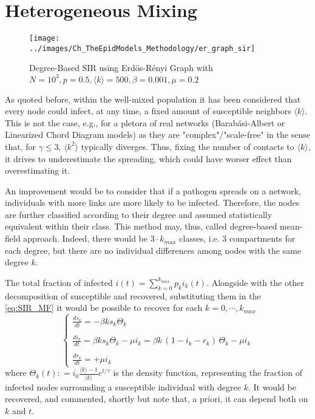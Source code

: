 \documentclass[a4paper,12pt,twoside]{book} %
\theoremstyle{definition}
\begin{document}
\newpage
\section{Heterogeneous Mixing}
\begin{figure}[ht]
	\texttt{[image: ../images/Ch\_TheEpidModels\_Methodology/er\_graph\_sir]}
	\caption{Degree-Based SIR using Erdös-Rényi Graph with $N = 10^{3}, p = 0.5, \langle k \rangle = 500, \beta = 0.001,  \mu = 0.2$}
	\label{fig:DB_SIR}
\end{figure}
As quoted before, within the well-mixed population it has been considered that every node could infect, at any time, a fixed amount of susceptible neighbors $\langle k \rangle$. This is not the case, e.g., for a pletora of real networks (Barabási-Albert or Linearized Chord Diagram models) as they are "complex"/"scale-free" in the sense that, for $\gamma \leq 3, \, \langle k^2 \rangle$ typically diverges. Thus, fixing the number of contacts to $\langle k \rangle$, it drives to underestimate the spreading, which could have worser effect than overestimating it. 

An improvement would be to consider that if a pathogen spreads on a network, individuals with more links are more likely to be infected. Therefore, the nodes are further classified according to their degree and assumed statistically equivalent within their class. This method may, thus, called degree-based mean-field approach. Indeed, there would be $3 \cdot k_{max}$ classes, i.e. $3$ compartments for each degree, but there are no individual differences among nodes with the same degree $k$. 

The total fraction of infected $i(t) = \sum_{k=0}^{k_{max}} p_k i_k(t)$. Alongside with the other decomposition of susceptible and recovered, substituting them in the \autoref{eq:SIR_MF} it would be possible to recover for each $k = 0,\cdots,k_{max}$
\begin{equation}
	\begin{cases}
		\frac{ds_k}{dt} = -\beta  k  s_k \Theta_k \\ \\ 
		\frac{di_k}{dt} = \beta  k  s_k \Theta_k - \mu i_k = \beta  k  \, (1-i_k-r_k) \, \Theta_k -\mu i_k \\ \\
		\frac{dr_k}{dt} = +\mu i_k
	\end{cases}
	\label{eqs:SIR_degree-based}
\end{equation}
where $\Theta_k(t): = i_0 \frac{\langle k \rangle - 1}{\langle k \rangle} e^{t/\tau}$ is the density function, representing the fraction of infected nodes surrounding a susceptible individual with degree $k$. It would be recovered, and commented, shortly but note that, a priori, it can depend both on $k$ and $t$.
\end{document}
